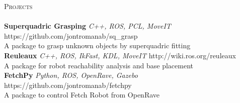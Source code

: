 \documentclass[a4paper]{article}
\newcommand{\lineunder} {
    \vspace*{-8pt} \\
    \hspace*{-18pt} \hrulefill \\
}
\newcommand{\header} [1] {
    {\hspace*{-18pt}\vspace*{6pt} \textsc{#1}}
    \vspace*{-6pt} \lineunder
}
\begin{document}
\header{Projects}
{\textbf{Superquadric Grasping} \sl C++, ROS, PCL, MoveIT} \hfill https://github.com/jontromanab/sq\_grasp\\
A package to grasp unknown objects by superquadric fitting\\
\vspace*{2mm}
{\textbf{Reuleaux} \sl C++, ROS, IkFast, KDL, MoveIT} \hfill http://wiki.ros.org/reuleaux\\
A package for robot reachability analysis and base placement\\
\vspace*{2mm}
{\textbf{FetchPy} \sl Python, ROS, OpenRave, Gazebo} \hfill https://github.com/jontromanab/fetchpy\\
A package to control Fetch Robot from OpenRave\\
\vspace*{2mm}

\vspace*{2mm}

        

\ 
\end{document}
